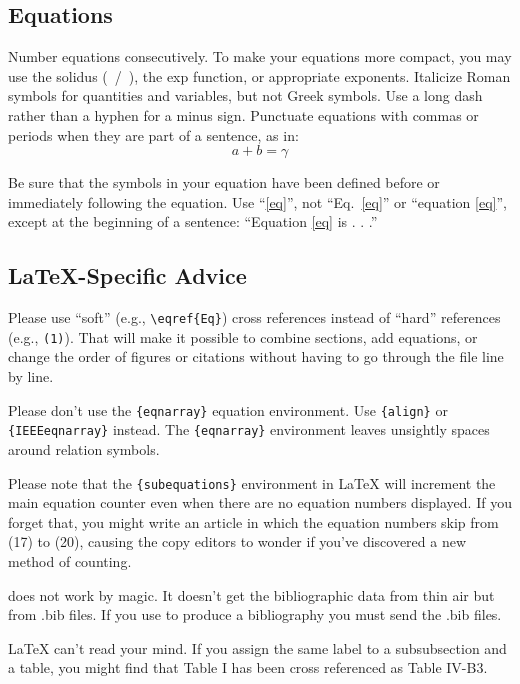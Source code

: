 \subsection{Equations}
Number equations consecutively. To make your 
equations more compact, you may use the solidus (~/~), the exp function, or 
appropriate exponents. Italicize Roman symbols for quantities and variables, 
but not Greek symbols. Use a long dash rather than a hyphen for a minus 
sign. Punctuate equations with commas or periods when they are part of a 
sentence, as in:
\begin{equation}
a+b=\gamma\label{eq}
\end{equation}

Be sure that the 
symbols in your equation have been defined before or immediately following 
the equation. Use ``\eqref{eq}'', not ``Eq.~\eqref{eq}'' or ``equation \eqref{eq}'', except at 
the beginning of a sentence: ``Equation \eqref{eq} is . . .''

\subsection{\LaTeX-Specific Advice}

Please use ``soft'' (e.g., \verb|\eqref{Eq}|) cross references instead
of ``hard'' references (e.g., \verb|(1)|). That will make it possible
to combine sections, add equations, or change the order of figures or
citations without having to go through the file line by line.

Please don't use the \verb|{eqnarray}| equation environment. Use
\verb|{align}| or \verb|{IEEEeqnarray}| instead. The \verb|{eqnarray}|
environment leaves unsightly spaces around relation symbols.

Please note that the \verb|{subequations}| environment in {\LaTeX}
will increment the main equation counter even when there are no
equation numbers displayed. If you forget that, you might write an
article in which the equation numbers skip from (17) to (20), causing
the copy editors to wonder if you've discovered a new method of
counting.

{\BibTeX} does not work by magic. It doesn't get the bibliographic
data from thin air but from .bib files. If you use {\BibTeX} to produce a
bibliography you must send the .bib files. 

{\LaTeX} can't read your mind. If you assign the same label to a
subsubsection and a table, you might find that Table I has been cross
referenced as Table IV-B3. 

